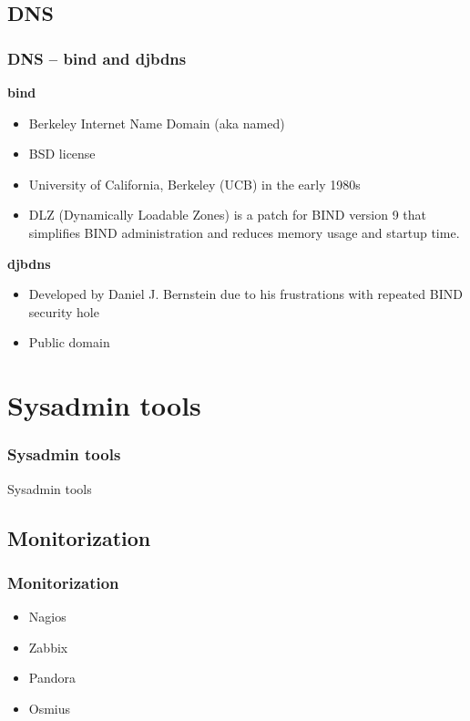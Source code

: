\documentclass{beamer}
\begin{document}
  \subsection{DNS}
  \begin{frame}
    \frametitle{DNS -- bind and djbdns}
    \textbf{bind}
    \begin{itemize}
      \item Berkeley Internet Name Domain (aka named)
      \item BSD license
      \item University of California, Berkeley (UCB) in the early 1980s
      \item DLZ (Dynamically Loadable Zones) is a patch for BIND version 9 that simplifies BIND administration and reduces memory usage and startup time. 
    \end{itemize}
    \textbf{djbdns}
    \begin{itemize}
      \item Developed by Daniel J. Bernstein due to his frustrations with repeated BIND security hole
      \item Public domain
    \end{itemize}
  \end{frame}


\section{Sysadmin tools}

\begin{frame}
  \frametitle{Sysadmin tools}
  \begin{center}
    \Huge Sysadmin tools
  \end{center}
\end{frame}

  \subsection{Monitorization}
  \begin{frame}
    \frametitle{Monitorization}
    \begin{itemize}
      \item Nagios
      \item Zabbix
      \item Pandora
      \item Osmius
    \end{itemize}
  \end{frame}
  
\end{document}
